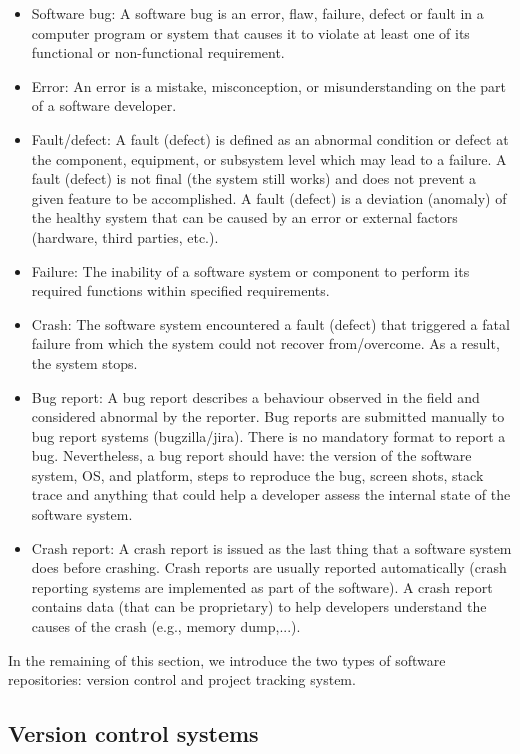 \begin{itemize}
	\item Software bug: A software bug is an error, flaw, failure, defect or fault in a computer program or system that causes it to violate at least one of its functional or non-functional requirement.
	\item Error: An error is a mistake, misconception, or misunderstanding on the part of a software developer.
	\item Fault/defect: A fault (defect) is defined as an abnormal condition or defect at the component, equipment, or subsystem level which may lead to a failure. A fault (defect) is not final (the system still works) and does not prevent a given feature to be accomplished.  A fault (defect) is a deviation (anomaly) of the healthy system that can be caused by an error or external factors (hardware, third parties, etc.).
	\item Failure: The inability of a software system or component to perform its required functions within specified requirements.
	\item Crash: The software system encountered a fault (defect) that triggered a fatal failure from which the system could not recover from/overcome. As a result, the system stops.
	\item Bug report: A bug report describes a behaviour observed in the field and considered abnormal by the reporter. Bug reports are submitted manually to bug report systems (bugzilla/jira). There is no mandatory format to report a bug. Nevertheless, a bug report should have: the version of the software system, OS, and platform, steps to reproduce the bug, screen shots, stack trace and anything that could help a developer assess the internal state of the software system.
	\item Crash report: A crash report is issued as the last thing that a software system does before crashing. Crash reports are usually reported automatically (crash reporting systems are implemented as part of the software). A crash report contains data (that can be proprietary) to help developers understand the causes of the crash (e.g., memory dump,...).

\end{itemize}

In the remaining of this section, we introduce the two types of software repositories: version control and project tracking system.

\subsection{Version control systems\label{sec:version-control}}

